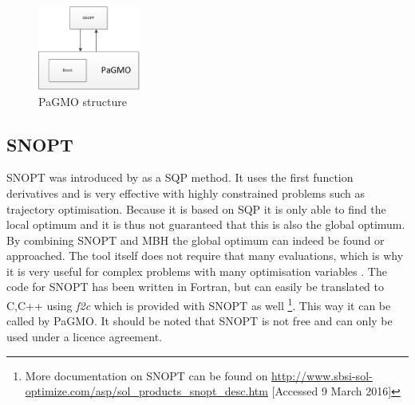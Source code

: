 \begin{figure}[!ht]
\centering
\includegraphics[width=0.3\textwidth]{figures/software/pagmoBlock.png}
\caption{\ac{PaGMO} structure}
\label{fig:pagmoBlock}
\end{figure}

\subsection{\ac{SNOPT}}
\label{subsec:snopt}
\ac{SNOPT} was introduced by \cite{gill2002snopt} as a \ac{SQP} method. It uses the first function derivatives and is very effective with highly constrained problems such as trajectory optimisation. Because it is based on \ac{SQP} it is only able to find  the local optimum and it is thus not guaranteed that this is also the global optimum. By combining \ac{SNOPT} and \ac{MBH} the global optimum can indeed be found or approached. The tool itself does not require that many evaluations, which is why it is very useful for complex problems with many optimisation variables \citep{gill2006user}. The code for \ac{SNOPT} has been written in Fortran, but can easily be translated to C,C++ using \textit{f2c} which is provided with \ac{SNOPT} as well \footnote{More documentation on \ac{SNOPT} can be found on \url{http://www.sbsi-sol-optimize.com/asp/sol_products_snopt_desc.htm} [Accessed 9 March 2016]}. This way it can be called by \ac{PaGMO}. It should be noted that \ac{SNOPT} is not free and can only be used under a licence agreement.

